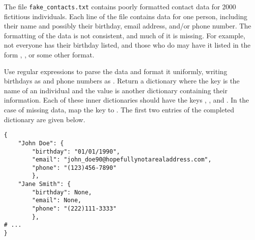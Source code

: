 \begin{problem}
The file \texttt{fake\_contacts.txt} contains poorly formatted contact data for 2000 fictitious individuals.
Each line of the file contains data for one person, including their name and possibly their birthday, email address, and/or phone number.
The formatting of the data is not consistent, and much of it is missing.
For example, not everyone has their birthday listed, and those who do may have it listed in the form , , or some other format.

Use regular expressions to parse the data and format it uniformly, writing birthdays as  and phone numbers as .
Return a dictionary where the key is the name of an individual and the value is another dictionary containing their information.
Each of these inner dictionaries should have the keys , , and .
In the case of missing data, map the key to .
The first two entries of the completed dictionary are given below.

\begin{lstlisting}
{
    "John Doe": {
        "birthday": "01/01/1990",
        "email": "john_doe90@hopefullynotarealaddress.com",
        "phone": "(123)456-7890"
        },
    "Jane Smith": {
        "birthday": None,
        "email": None,
        "phone": "(222)111-3333"
        },
# ...
}
\end{lstlisting}
\end{problem}

